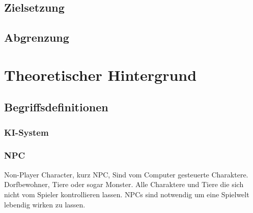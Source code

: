 \documentclass[12pt,a4paper,bibliography=totocnumbered,listof=totocnumbered]{scrartcl}
\begin{document}
\subsection{Zielsetzung}
\subsection{Abgrenzung}

\section{Theoretischer Hintergrund}

\subsection{Begriffsdefinitionen}%

\subsubsection{KI-System}
\subsubsection{NPC}%
Non-Player Character, kurz NPC, Sind vom Computer gesteuerte Charaktere. Dorfbewohner, Tiere oder sogar Monster. Alle Charaktere und Tiere die sich nicht vom Spieler kontrollieren lassen. NPCs sind notwendig um eine Spielwelt lebendig wirken zu lassen.
\end{document}

